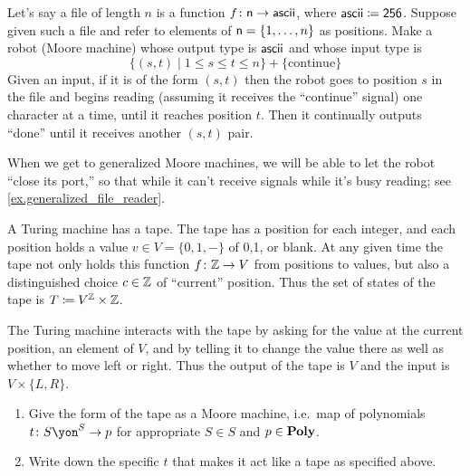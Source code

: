 \documentclass[Book-Poly]{subfiles}
\begin{document}
\begin{exercise}\label{exc.file_reader}
Let's say a file of length $n$ is a function $f\colon\mathsf{n}\to\mathsf{ascii}$, where $\mathsf{ascii}\coloneqq\textsf{2}\textsf{5}\textsf{6}$. Suppose given such a file and refer to elements of $\mathsf{n}=\{1,\ldots,n\}$ as positions. Make a robot (Moore machine) whose output type is $\mathsf{ascii}$ and whose input type is
\[
\{(s,t)\mid 1\leq s\leq t\leq n\}+\{\text{continue}\}
\]
Given an input, if it is of the form $(s,t)$ then the robot goes to position $s$ in the file and begins reading (assuming it receives the ``continue'' signal) one character at a time, until it reaches position $t$. Then it continually outputs ``done'' until it receives another $(s,t)$ pair.
\end{exercise}

When we get to generalized Moore machines, we will be able to let the robot ``close its port,'' so that while it can't receive signals while it's busy reading; see \cref{ex.generalized_file_reader}.

\begin{exercise}
A Turing machine has a tape. The tape has a position for each integer, and each position holds a value $v\in V=\{0,1,-\}$ of 0,1, or blank. At any given time the tape not only holds this function $f\colon\mathbb{Z}\to V$ from positions to values, but also a distinguished choice $c\in\mathbb{Z}$ of ``current'' position. Thus the set of states of the tape is $T\coloneqq V^{\mathbb{Z}}\times\mathbb{Z}$.

The Turing machine interacts with the tape by asking for the value at the current position, an element of $V$, and by telling it to change the value there as well as whether to move left or right. Thus the output of the tape is $V$ and the input is $V\times\{L,R\}$.

\begin{enumerate}
	\item Give the form of the tape as a Moore machine, i.e.\ map of polynomials $t\colon S\yon^S\to p$ for appropriate $S\in S$ and $p\in\textbf{Poly}$.
	\item Write down the specific $t$ that makes it act like a tape as specified above.
\qedhere
\end{enumerate}
\end{exercise}
\end{document}

